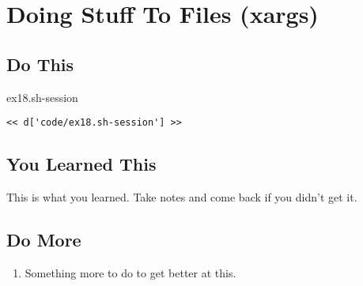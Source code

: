 \chapter{Doing Stuff To Files (xargs)}

\section{Do This}

\begin{code}{ex18.sh-session}
\begin{Verbatim}
<< d['code/ex18.sh-session'] >>
\end{Verbatim}
\end{code}


\section{You Learned This}

This is what you learned.  Take notes and come back if you didn't get it.

\section{Do More}

\begin{enumerate}
\item Something more to do to get better at this.
\end{enumerate}

